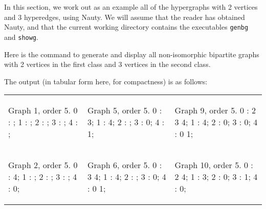 In this section, we work out as an example all of the hypergraphs with 2 vertices and 3 hyperedges, using Nauty.
We will assume that the reader has obtained Nauty, and that the current working directory contains the executables \texttt{genbg} and \texttt{showg}.

Here is the command to generate and display all non-isomorphic bipartite graphs with 2 vertices in the first class and 3 vertices in the second class.


The output (in tabular form here, for compactness) is as follows:

\begin{tabular}{|p{1.5in} | p{1.5in} | p{1.5in} |}
\begin{minipage}{1.5in}
\begin{datalisting}
Graph 1, order 5.
0 : ;
1 : ;
2 : ;
3 : ;
4 : ;

\end{datalisting}
\end{minipage}
&
\begin{minipage}{1.5in}
\begin{datalisting}
Graph 5, order 5.
0 : 3;
1 : 4;
2 : ;
3 : 0;
4 : 1;

\end{datalisting}
\end{minipage}
& 
\begin{minipage}{1.5in}
\begin{datalisting}
Graph 9, order 5.
0 : 2 3 4;
1 : 4;
2 : 0;
3 : 0;
4 : 0 1;

\end{datalisting}
\end{minipage}
\\
\begin{minipage}{1.5in}
\begin{datalisting}
Graph 2, order 5.
0 : 4;
1 : ;
2 : ;
3 : ;
4 : 0;

\end{datalisting}
\end{minipage}
&
\begin{minipage}{1.5in}
\begin{datalisting}
Graph 6, order 5.
0 : 3 4;
1 : 4;
2 : ;
3 : 0;
4 : 0 1;

\end{datalisting}
\end{minipage}
&
\begin{minipage}{1.5in}
\begin{datalisting}
Graph 10, order 5.
0 : 2 4;
1 : 3;
2 : 0;
3 : 1;
4 : 0;


\end{datalisting}
\end{minipage}
\end{tabular}
